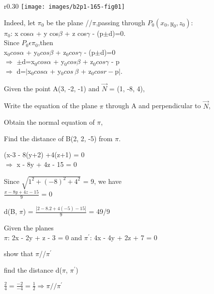 \documentclass[11pt]{amsbook}
\begin{document}
\begin{wrapfigure}{r}{0.30\textwidth}
    \texttt{[image: images/b2p1-165-fig01]}
\end{wrapfigure}
Indeed, let $\pi_{0}$ be the plane //$\pi$,passing through $P_{0}(x_{0},  y_{0}, z_{0})$:\\
$\pi_{0}$: x cos$\alpha$ + y cos$\beta$ + z cos$\gamma$ - (p$\pm$d)=0.\\
Since $P_{0}\epsilon\pi_{0}$,then \\
x$_{0}cos\alpha$ + y$_{0}cos\beta$ + z$_{0}cos\gamma$ - (p$\pm$d)=0\\
$\Rightarrow $ $\pm$d=x$_{0}cos\alpha$ + y$_{0}cos\beta$ + z$_{0}cos\gamma$ - p\\
$\Rightarrow $ d=$|$x$_{0}cos\alpha$ + y$_{0}cos\
\beta$ + z$_{0}cosr - $p$|$.
\\
\begin{exmp}Given the point A(3, -2, -1) and $\vec{N}$ = (1, -8, 4),
\begin{hEnumerateAlpha}
    \item Write the equation of the plane $\pi$ through A and perpendicular to $\vec{N}$,
    \item Obtain the normal equation of $\pi$,
    \item Find the distance of B(2, 2, -5) from $\pi$.
\end{hEnumerateAlpha}
\end{exmp}
\begin{hSolution}
\begin{hEnumerateAlpha}
   \item (x-3 - 8(y+2) +4(z+1) = 0\\
   $\Rightarrow$ x - 8y + 4z - 15 = 0
   \item Since $\sqrt{1^2 + (-8)^2 + 4^2}$ = 9, we have\\
   $\frac{x - 8y + 4z - 15}{9}$ = 0
   \item d(B, $\pi$) = $\frac{|2 - 8.2 + 4(-5) - 15|}{9}$ = 49/9
\end{hEnumerateAlpha}
\end{hSolution}
\begin{exmp} Given the planes\\
$\pi$: 2x - 2y + z - 3 = 0 and $\pi^\prime$: 4x - 4y + 2z + 7 = 0
\begin{hEnumerateAlpha}
\item show that $\pi$//$\pi^\prime$
\item find the distance d($\pi$, $\pi^\prime$)
\end{hEnumerateAlpha}
\end{exmp}
\begin{hSolution}
\begin{hEnumerateAlpha}
\item $\frac{2}{4} = \frac{-2}{-4}
=\frac{1}{2} \Rightarrow \pi//\pi^\prime$
\end{hEnumerateAlpha}
\end{hSolution}

\end{document}
